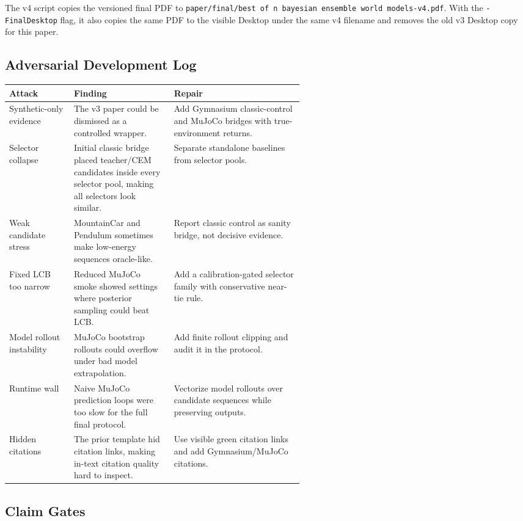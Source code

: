 \documentclass{article}
\begin{document}
The v4 script copies the versioned final PDF to
\texttt{paper/final/best of n bayesian ensemble world models-v4.pdf}. With the
\texttt{-FinalDesktop} flag, it also copies the same PDF to the visible Desktop
under the same v4 filename and removes the old v3 Desktop copy for this paper.

\subsection{Adversarial Development Log}

\begin{center}
\small
\begin{tabularx}{\linewidth}{p{0.22\linewidth}p{0.34\linewidth}X}
\toprule
Attack & Finding & Repair \\
\midrule
Synthetic-only evidence &
The v3 paper could be dismissed as a controlled wrapper. &
Add Gymnasium classic-control and MuJoCo bridges with true-environment returns. \\
Selector collapse &
Initial classic bridge placed teacher/CEM candidates inside every selector
pool, making all selectors look similar. &
Separate standalone baselines from selector pools. \\
Weak candidate stress &
MountainCar and Pendulum sometimes make low-energy sequences oracle-like. &
Report classic control as sanity bridge, not decisive evidence. \\
Fixed LCB too narrow &
Reduced MuJoCo smoke showed settings where posterior sampling could beat LCB. &
Add a calibration-gated selector family with conservative near-tie rule. \\
Model rollout instability &
MuJoCo bootstrap rollouts could overflow under bad model extrapolation. &
Add finite rollout clipping and audit it in the protocol. \\
Runtime wall &
Naive MuJoCo prediction loops were too slow for the full final protocol. &
Vectorize model rollouts over candidate sequences while preserving outputs. \\
Hidden citations &
The prior template hid citation links, making in-text citation quality hard to
inspect. &
Use visible green citation links and add Gymnasium/MuJoCo citations. \\
\bottomrule
\end{tabularx}
\end{center}

\subsection{Claim Gates}
\end{document}
